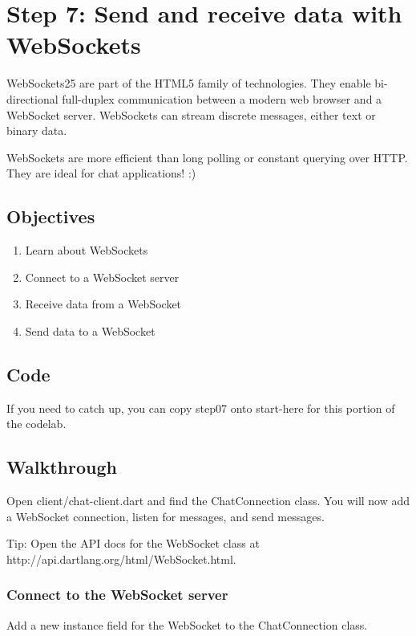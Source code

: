 \section{Step 7: Send and receive data with WebSockets}

WebSockets25 are part of the HTML5 family of technologies. They enable bi-directional full-duplex communication between a modern web browser and a WebSocket server. WebSockets can stream discrete messages, either text or binary data.

WebSockets are more efficient than long polling or constant querying over HTTP. They are ideal for chat applications! :)

\subsection{Objectives}

\begin{enumerate}
\item Learn about WebSockets
\item Connect to a WebSocket server
\item Receive data from a WebSocket
\item Send data to a WebSocket
\end{enumerate}

\subsection{Code}

If you need to catch up, you can copy step07 onto start-here for this portion of the codelab.

\subsection{Walkthrough}

Open client/chat-client.dart and find the ChatConnection class. You will now add a WebSocket connection, listen for messages, and send messages.

Tip: Open the API docs for the WebSocket class at http://api.dartlang.org/html/WebSocket.html.

\subsubsection{Connect to the WebSocket server}

Add a new instance field for the WebSocket to the ChatConnection class.

